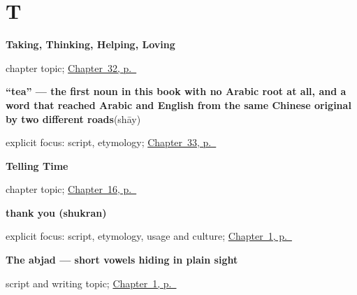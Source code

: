 \section*{T}

\noindent\begin{minipage}[t]{\linewidth}
\raggedright
\textbf{Taking, Thinking, Helping, Loving}\par
\footnotesize chapter topic; \hyperref[ch:ar-taking-thinking-helping-loving]{Chapter~32, p.~\pageref*{ch:ar-taking-thinking-helping-loving}}
\end{minipage}\par\smallskip

\noindent\begin{minipage}[t]{\linewidth}
\raggedright
\textbf{\textquotedblleft{}tea\textquotedblright{} — the first noun in this book with no Arabic root at all, and a word that reached Arabic and English from the same Chinese original by two different roads}\enspace\emph{}\enspace(shāy)\par
\footnotesize explicit focus: script, etymology; \hyperref[ch:ar-asking-for-a-drink]{Chapter~33, p.~\pageref*{ch:ar-asking-for-a-drink}}
\end{minipage}\par\smallskip

\noindent\begin{minipage}[t]{\linewidth}
\raggedright
\textbf{Telling Time}\par
\footnotesize chapter topic; \hyperref[ch:ar-telling-time]{Chapter~16, p.~\pageref*{ch:ar-telling-time}}
\end{minipage}\par\smallskip

\noindent\begin{minipage}[t]{\linewidth}
\raggedright
\textbf{thank you (shukran)}\enspace\emph{}\par
\footnotesize explicit focus: script, etymology, usage and culture; \hyperref[ch:greetings]{Chapter~1, p.~\pageref*{ch:greetings}}
\end{minipage}\par\smallskip

\noindent\begin{minipage}[t]{\linewidth}
\raggedright
\textbf{The abjad — short vowels hiding in plain sight}\par
\footnotesize script and writing topic; \hyperref[ch:greetings]{Chapter~1, p.~\pageref*{ch:greetings}}
\end{minipage}\par\smallskip

